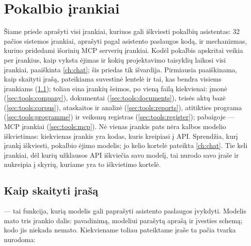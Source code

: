\chapter{Pokalbio įrankiai}\label{app:tools}

Šiame priede aprašyti visi įrankiai, kuriuos gali iškviesti pokalbių asistentas: 32 pačios
sistemos įrankiai, aprašyti pagal asistento paslaugos  kodą, ir mechanizmas, kuriuo
pridedami išorinių MCP serverių įrankiai. Kodėl pokalbis apskritai veikia per įrankius, kaip
vyksta ėjimas ir kokių projektavimo taisyklių laikosi visi įrankiai, paaiškinta
\cref{ch:chat}; šis priedas tik išvardija. Pirmiausia paaiškinama, kaip skaityti įrašą,
pateikiama suvestinė lentelė ir tai, kas bendra visiems įrankiams (\cref{sec:tools:read}); toliau
eina įrankių šeimos, po vieną  failą kiekvienai: įmonė
(\cref{sec:tools:company}), dokumentai (\cref{sec:tools:documents}), teisės aktų bazė
(\cref{sec:tools:corpus}), ataskaitos ir analizė (\cref{sec:tools:reports}), atitikties programa
(\cref{sec:tools:programme}) ir veiksmų registras (\cref{sec:tools:register}); pabaigoje ---
MCP įrankiai (\cref{sec:tools:mcp}). Nė vienas įrankis pats nėra kalbos modelio iškvietimas:
kiekvienas įrankis yra kodas, kuris kreipiasi į API. Sprendžia, kurį įrankį iškviesti,
pokalbio ėjimo modelis; jo kelio kortelė pateikta \cref{ch:chat}. Tie keli įrankiai, dėl kurių
užklausos API iškviečia savo modelį, tai nurodo savo įraše ir nukreipia į skyrių, kuriame
yra to iškvietimo kortelė.


\section{Kaip skaityti įrašą}\label{sec:tools:read}

 --- tai funkcija, kurią modelis gali paprašyti asistento paslaugos įvykdyti.
Modelis mato tris įrankio dalis: pavadinimą, modeliui parašytą aprašą ir įvesties schemą; kodo jis
niekada nemato. Kiekviename toliau pateiktame įraše ta pačia tvarka nurodoma:

